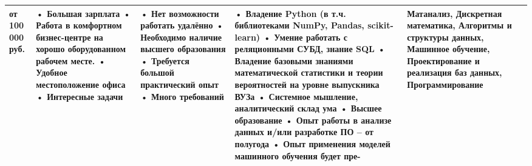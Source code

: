 \documentclass[14pt]{extreport}
\begin{document}
\begin{landscape}
\begin{table}[H]
\begin{center}
\begin{small}
\begin{tabular}{|p{0.1cm}|p{5cm}|p{4.5cm}|p{4.5cm}|p{4cm}|p{3cm}|}
				от 100 000 руб.
				&
				• Большая зарплата
				\newline• Работа в комфортном бизнес-центре на хорошо оборудованном рабочем месте.
				\newline• Удобное местоположение офиса
				\newline• Интересные задачи
				&
				• Нет возможности работать удалённо
				\newline• Необходимо наличие высшего образования
				\newline• Требуется большой практический опыт
				\newline• Много требований
				&
				• Владение Python (в т.ч. библиотеками NumPy, Pandas, scikit-learn)
				\newline• Умение работать с реляционными СУБД, знание SQL
				\newline• Владение базовыми знаниями математической статистики и теории вероятностей на уровне выпускника ВУЗа
				\newline• Системное мышление, аналитический склад ума
				\newline• Высшее образование
				\newline• Опыт работы в анализе данных и/или разработке ПО – от полугода
				\newline• Опыт применения моделей машинного обучения будет пре-
				&
				Матанализ, Дискретная математика, Алгоритмы и структуры данных, Машинное обучение, Проектирование и реализация баз данных, Программирование
				\\
				\hline

					
				\end{tabular}
			\end{small}
		\end{center}
	\end{table}


\end{landscape}
\end{document}
